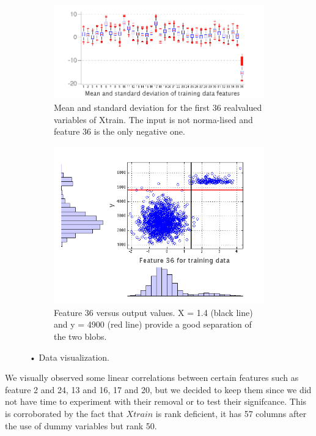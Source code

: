 \documentclass{article} %
\begin{document}
\begin{figure}[h]
  \begin{subfigure}[b]{0.5\textwidth}
   \includegraphics[width=\textwidth]{figures/dist_regression.png}
    \caption{Mean and standard deviation for the first 36 real\newline valued variables of Xtrain. The input is not norma-\newline lised and feature 36 is the only negative one.}
    \label{fig:dist_regression}
  \end{subfigure}
  \begin{subfigure}[b]{0.5\textwidth}
    \includegraphics[width=\textwidth]{figures/feature36.png}
    \caption{Feature 36 versus output values. X = 1.4 (black line) and y = 4900 (red line)  provide a good separation of the two blobs.}
    \label{fig:feature36}
  \end{subfigure}
  \caption{• Data visualization. }
\end{figure}

We visually observed some linear correlations between certain features such as feature 2 and 24, 13 and 16, 17 and 20, but we decided to keep them since we did not have time to experiment with their removal or to test their signifcance. This is corroborated by the fact that $Xtrain$ is rank deficient, it has 57 columns after the use of dummy variables but rank 50.
\end{document}
